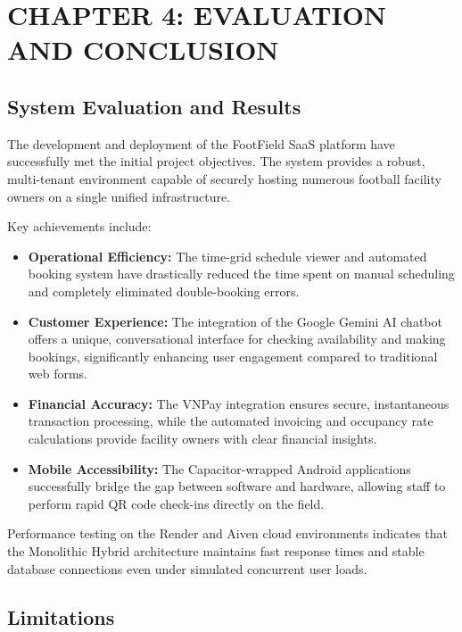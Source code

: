 \section*{CHAPTER 4: EVALUATION AND CONCLUSION}
\setcounter{section}{4}
\setcounter{subsection}{0}
\setcounter{figure}{0}
\setcounter{table}{0}

\subsection{System Evaluation and Results}

The development and deployment of the FootField SaaS platform have successfully met the initial project objectives. The system provides a robust, multi-tenant environment capable of securely hosting numerous football facility owners on a single unified infrastructure. 

Key achievements include:
\begin{itemize}
    \item \textbf{Operational Efficiency:} The time-grid schedule viewer and automated booking system have drastically reduced the time spent on manual scheduling and completely eliminated double-booking errors.
    \item \textbf{Customer Experience:} The integration of the Google Gemini AI chatbot offers a unique, conversational interface for checking availability and making bookings, significantly enhancing user engagement compared to traditional web forms.
    \item \textbf{Financial Accuracy:} The VNPay integration ensures secure, instantaneous transaction processing, while the automated invoicing and occupancy rate calculations provide facility owners with clear financial insights.
    \item \textbf{Mobile Accessibility:} The Capacitor-wrapped Android applications successfully bridge the gap between software and hardware, allowing staff to perform rapid QR code check-ins directly on the field.
\end{itemize}

Performance testing on the Render and Aiven cloud environments indicates that the Monolithic Hybrid architecture maintains fast response times and stable database connections even under simulated concurrent user loads.

\subsection{Limitations}

